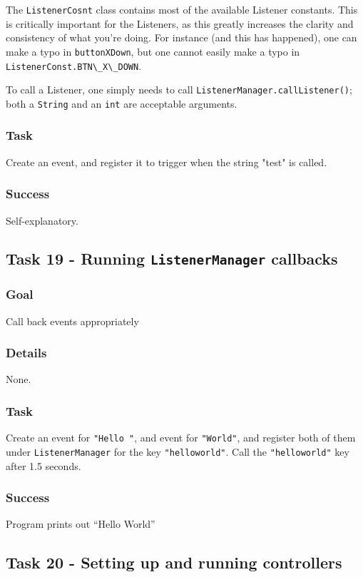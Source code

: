 \documentclass[a4paper]{article}
\begin{document}
The \lstinline{ListenerCosnt} class contains most of the available Listener constants. This is critically important for the Listeners, as this greatly increases the clarity and consistency of what you're doing. For instance (and this has happened), one can make a typo in \lstinline{buttonXDown}, but one cannot easily make a typo in \lstinline{ListenerConst.BTN\_X\_DOWN}.

To call a Listener, one simply needs to call \lstinline{ListenerManager.callListener()}; both a \lstinline{String} and an \lstinline{int} are acceptable arguments.
\subsubsection{Task} Create an event, and register it to trigger when the string "test" is called.
\subsubsection{Success} Self-explanatory.

\subsection{Task 19 - Running \lstinline{ListenerManager} callbacks}
\subsubsection{Goal} Call back events appropriately
\subsubsection{Details} None.
\subsubsection{Task} Create an event for \lstinline{"Hello "}, and event for \lstinline{"World"}, and register both of them under \lstinline{ListenerManager} for the key \lstinline{"helloworld"}. Call the \lstinline{"helloworld"} key after 1.5 seconds.
\subsubsection{Success} Program prints out ``Hello World''

\subsection{Task 20 - Setting up and running controllers}
\end{document}
